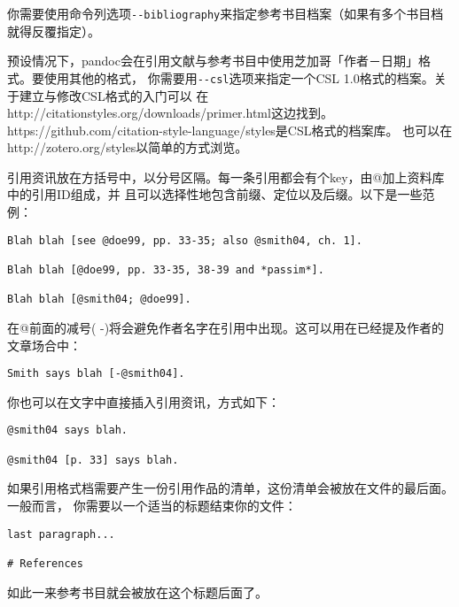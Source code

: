 \documentclass[fancyhdr,bookmark]{ctexbook}
\begin{document}
你需要使用命令列选项\lstinline!--bibliography!来指定参考书目档案（如果有多个书目档就得反覆指定）。

预设情况下，pandoc会在引用文献与参考书目中使用芝加哥「作者－日期」格式。要使用其他的格式，
你需要用\lstinline!--csl!选项来指定一个CSL
1.0格式的档案。关于建立与修改CSL格式的入门可以
在http://citationstyles.org/downloads/primer.html这边找到。
https://github.com/citation-style-language/styles是CSL格式的档案库。
也可以在http://zotero.org/styles以简单的方式浏览。

引用资讯放在方括号中，以分号区隔。每一条引用都会有个key，由@加上资料库中的引用ID组成，并
且可以选择性地包含前缀、定位以及后缀。以下是一些范例：

\begin{lstlisting}
Blah blah [see @doe99, pp. 33-35; also @smith04, ch. 1].

Blah blah [@doe99, pp. 33-35, 38-39 and *passim*].

Blah blah [@smith04; @doe99].
\end{lstlisting}

在@前面的减号(
-)将会避免作者名字在引用中出现。这可以用在已经提及作者的文章场合中：

\begin{lstlisting}
Smith says blah [-@smith04].
\end{lstlisting}

你也可以在文字中直接插入引用资讯，方式如下：

\begin{lstlisting}
@smith04 says blah.

@smith04 [p. 33] says blah.
\end{lstlisting}

如果引用格式档需要产生一份引用作品的清单，这份清单会被放在文件的最后面。一般而言，
你需要以一个适当的标题结束你的文件：

\begin{lstlisting}
last paragraph...

# References
\end{lstlisting}

如此一来参考书目就会被放在这个标题后面了。

\backmatter
\end{document}
